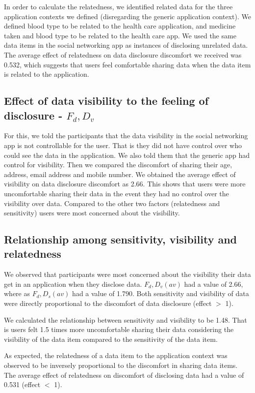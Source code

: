 \documentclass[10pt]{article}
\begin{document}
In order to calculate the relatedness, we identified related data for the three application contexts we defined (disregarding the generic application context). We defined blood type to be related to the health care application, and medicine taken and blood type to be related to the health care app. We used the same data items in the social networking app as instances of disclosing unrelated data. The average effect of relatedness on data disclosure discomfort we received was 0.532, which suggests that users feel comfortable sharing data when the data item is related to the application. 

\subsection{Effect of data visibility to the feeling of disclosure -  $F_d,D_v$}
For this, we told the participants that the data visibility in the social networking app is not controllable for the user. That is they did not have control over who could see the data in the application. We also told them that the generic app had control for visibility. Then we compared the discomfort of sharing their age, address, email address and mobile number. We obtained the average effect of visibility on data disclosure discomfort as 2.66. This shows that users were more uncomfortable sharing their data in the event they had no control over the visibility over data. Compared to the other two factors (relatedness and sensitivity) users were most concerned about the visibility.


\subsection {Relationship among sensitivity, visibility and relatedness}

We observed that participants were most concerned about the visibility their data get in an application when they disclose data. $F_d,D_v(av)$ had a value of 2.66, where as $F_d,D_s(av)$ had a value of 1.790. Both sensitivity and visibility of data were directly proportional to the discomfort of data disclosure (effect $>$ 1). 

We calculated the relationship between sensitivity and visibility to be 1.48. That is users felt 1.5 times more uncomfortable sharing their data considering the visibility of the data item compared to the sensitivity of the data item. 

As expected, the relatedness of a data item to the application context was observed to be inversely proportional to the discomfort in sharing data items. The average effect of relatedness on discomfort of disclosing data had a value of 0.531 (effect $<$ 1).
\end{document}
